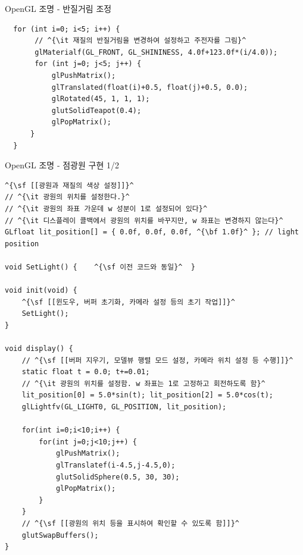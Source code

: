 \documentclass{beamer}
\begin{document}
\begin{frame}[fragile]{OpenGL 조명 - 반질거림 조정}

\lstset{language=C++, escapechar=^} 
\begin{lstlisting}
  for (int i=0; i<5; i++) {
       // ^{\it 재질의 반질거림을 변경하여 설정하고 주전자를 그림}^
       glMaterialf(GL_FRONT, GL_SHININESS, 4.0f+123.0f*(i/4.0)); 
       for (int j=0; j<5; j++) {
           glPushMatrix();
           glTranslated(float(i)+0.5, float(j)+0.5, 0.0);
           glRotated(45, 1, 1, 1);
           glutSolidTeapot(0.4);
           glPopMatrix();
      }
  }
\end{lstlisting}

\begin{figure}[h!]
  \centering
\end{figure}

\end{frame}


\begin{frame}[fragile]{OpenGL 조명 - 점광원 구현 1/2}

\lstset{language=C++, escapechar=^} 
\begin{lstlisting}
^{\sf [[광원과 재질의 색상 설정]]}^
// ^{\it 광원의 위치를 설정한다.}^
// ^{\it 광원의 좌표 가운데 w 성분이 1로 설정되어 있다}^
// ^{\it 디스플레이 콜백에서 광원의 위치를 바꾸지만, w 좌표는 변경하지 않는다}^
GLfloat lit_position[] = { 0.0f, 0.0f, 0.0f, ^{\bf 1.0f}^ }; // light position

void SetLight() {    ^{\sf 이전 코드와 동일}^  }

void init(void) {
    ^{\sf [[윈도우, 버퍼 초기화, 카메라 설정 등의 초기 작업]]}^
    SetLight();
}

void display() {
    // ^{\sf [[버퍼 지우기, 모델뷰 행렬 모드 설정, 카메라 위치 설정 등 수행]]}^
    static float t = 0.0; t+=0.01;
    // ^{\it 광원의 위치를 설정함. w 좌표는 1로 고정하고 회전하도록 함}^
    lit_position[0] = 5.0*sin(t); lit_position[2] = 5.0*cos(t);
    glLightfv(GL_LIGHT0, GL_POSITION, lit_position);

    for(int i=0;i<10;i++) {
        for(int j=0;j<10;j++) {
            glPushMatrix();
            glTranslatef(i-4.5,j-4.5,0);
            glutSolidSphere(0.5, 30, 30);
            glPopMatrix();
        }
    }
    // ^{\sf [[광원의 위치 등을 표시하여 확인할 수 있도록 함]]}^
    glutSwapBuffers();
}
\end{lstlisting}

\end{frame}
\end{document}
